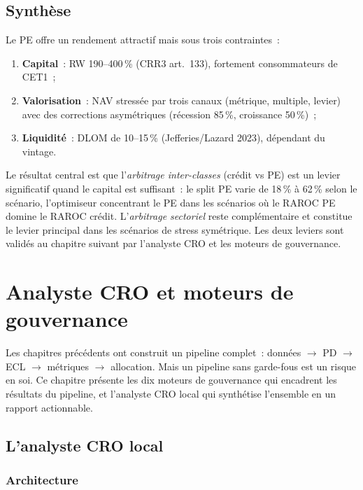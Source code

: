 \documentclass[12pt, a4paper, twoside, openright]{report}
\theoremstyle{definition}
\begin{document}
\section{Synthèse}
\label{sec:pe:synthese}

Le PE offre un rendement attractif mais sous trois contraintes~:
\begin{enumerate}[nosep]
  \item \textbf{Capital}~: RW 190--400\,\% (CRR3 art.~133), fortement consommateurs de CET1~;
  \item \textbf{Valorisation}~: NAV stressée par trois canaux (métrique, multiple, levier) avec des corrections asymétriques (récession 85\,\%, croissance 50\,\%)~;
  \item \textbf{Liquidité}~: DLOM de 10--15\,\% (Jefferies/Lazard 2023), dépendant du vintage.
\end{enumerate}

Le résultat central est que l'\emph{arbitrage inter-classes} (crédit vs PE) est un levier significatif quand le capital est suffisant~: le split PE varie de 18\,\% à 62\,\% selon le scénario, l'optimiseur concentrant le PE dans les scénarios où le RAROC PE domine le RAROC crédit. L'\emph{arbitrage sectoriel} reste complémentaire et constitue le levier principal dans les scénarios de stress symétrique. Les deux leviers sont validés au chapitre suivant par l'analyste CRO et les moteurs de gouvernance.


\chapter{Analyste CRO et moteurs de gouvernance}
\label{chap:gouvernance}

Les chapitres précédents ont construit un pipeline complet~: données $\to$ PD $\to$ ECL $\to$ métriques $\to$ allocation. Mais un pipeline sans garde-fous est un risque en soi. Ce chapitre présente les dix moteurs de gouvernance qui encadrent les résultats du pipeline, et l'analyste CRO local qui synthétise l'ensemble en un rapport actionnable.

\section{L'analyste CRO local}
\label{sec:gouv:cro}

\subsection{Architecture}
\end{document}
